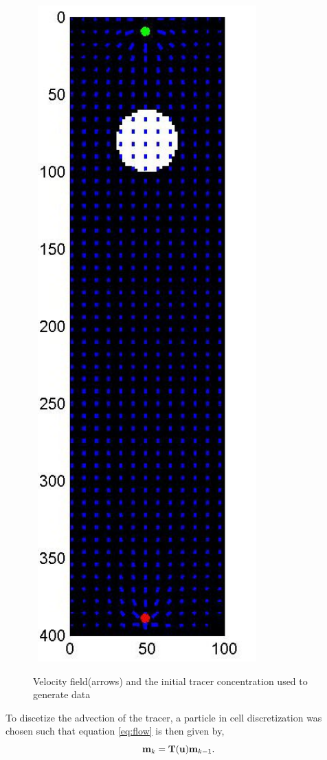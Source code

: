 \documentclass[12pt]{article}
\newcommand{\bfT}	{{\bf{T}}}
\newcommand{\bfm}	{{\bf{m}}}
\newcommand{\bfu}	{{\bf{u}}}
\begin{document}
%
\begin{figure}[h!]
\begin{center}
\	\includegraphics[width=0.75\textwidth]{figures/flow}
\end{center}
\caption{Velocity field(arrows) and the initial tracer concentration used to generate data}
\end{figure}
To discetize the advection of the tracer, a particle in cell discretization was chosen such that equation \eqref{eq:flow} is then given by,
\begin{equation*}
\bfm _k= \bfT(\bfu)\bfm_{k-1}. 
\end{equation*}
\end{document}

